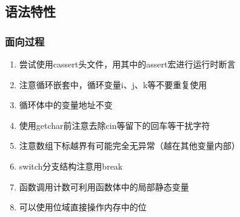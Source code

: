 \documentclass[onecolumn]{article}
\begin{document}
    \subsection{语法特性}
        \subsubsection{面向过程}
            \noindent
            \begin{enumerate}
                \item 尝试使用cassert头文件，用其中的assert宏进行运行时断言
                \item 注意循环嵌套中，循环变量i、j、k等不要重复使用
                \item 循环体中的变量地址不变
                \item 使用getchar前注意去除cin等留下的回车等干扰字符
                \item 注意数组下标越界有可能完全无异常（越在其他变量内部）
                \item switch分支结构注意用break
                \item 函数调用计数可利用函数体中的局部静态变量
                \item 可以使用位域直接操作内存中的位
            \end{enumerate}
\end{document}
